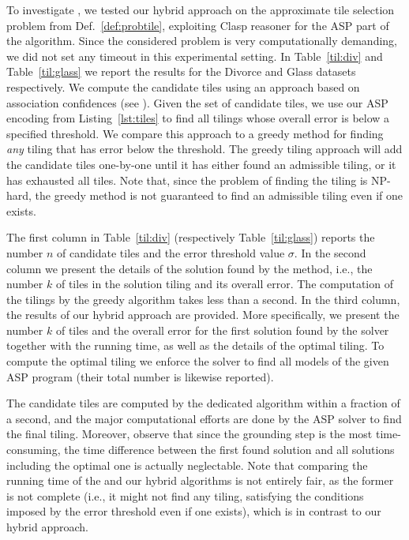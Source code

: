 To investigate \qsix, we tested our hybrid approach on the approximate tile selection problem from Def.~\ref{def:probtile}, exploiting Clasp reasoner for the ASP part of the algorithm. Since the considered problem is very computationally demanding, we did not set any timeout in this experimental setting. In Table~\ref{til:div} and Table~\ref{til:glass} we report the results for the Divorce and Glass datasets respectively. We compute the candidate tiles using an approach based on association confidences (see \textcite{dbp}). Given the set of candidate tiles, we use our ASP encoding from Listing~\ref{lst:tiles} to find all tilings whose overall error is below a specified threshold. We compare this approach to a greedy method for finding \emph{any} tiling that has error below the threshold. The greedy tiling approach will add the candidate tiles one-by-one until it has either found an admissible tiling, or it has exhausted all tiles. Note that, since the problem of finding the tiling is NP-hard, the greedy method is not guaranteed to find an admissible tiling even if one exists. 

The first column in Table~\ref{til:div} (respectively Table~\ref{til:glass}) reports the number $n$ of candidate tiles and the error threshold value $\sigma$. In the second column we present the details of the solution found by the  method, i.e., the number $k$ of tiles in the solution tiling and its overall error. The computation of the tilings by the greedy algorithm takes less than a second. %
In the third column, the results of our hybrid approach are provided. More specifically, we present the number $k$ of tiles and the overall error for the first solution found by the solver together with the running time, as well as the details of the optimal tiling. To compute the optimal tiling we enforce the solver to find all models of the given ASP program (their total number is likewise reported). 

 The candidate tiles are computed by the dedicated algorithm within a fraction of a second, and the major computational efforts are done by the ASP solver to find the final tiling. Moreover, observe that since the grounding step is the most time-consuming, the time difference between the first found solution and all solutions including the optimal one is actually neglectable.
Note that comparing the running time of the  and our hybrid algorithms is not entirely fair, as the former is not complete (i.e., it might not find any tiling, satisfying the conditions imposed by the error threshold even if one exists), which is in contrast to our hybrid approach.

